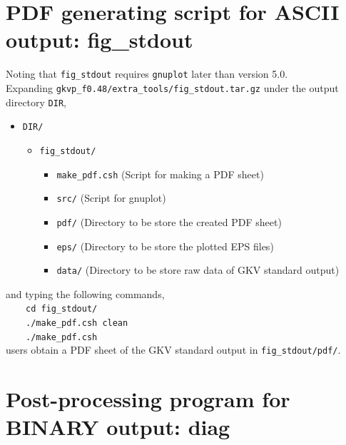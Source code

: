 \section{PDF generating script for ASCII output: fig\_stdout}
\label{sec:PDF generating script for ASCII output: fig_stdout}

Noting that \texttt{fig\_stdout} requires \texttt{gnuplot} later than version 5.0.\\ 
Expanding \texttt{gkvp\_f0.48/extra\_tools/fig\_stdout.tar.gz} under the output directory \texttt{DIR},
\begin{itemize}
  \item \texttt{DIR/}
  \begin{itemize}
    \item \texttt{fig\_stdout/}
    \begin{itemize}
      \item \texttt{make\_pdf.csh} (Script for making a PDF sheet)
      \item \texttt{src/} (Script for gnuplot)
      \item \texttt{pdf/} (Directory to be store the created PDF sheet)
      \item \texttt{eps/} (Directory to be store the plotted EPS files)
      \item \texttt{data/} (Directory to be store raw data of GKV standard output)
    \end{itemize}
  \end{itemize}
\end{itemize}
and typing the following commands,\\
~~~~\texttt{cd fig\_stdout/}\\
~~~~\texttt{./make\_pdf.csh  clean}\\
~~~~\texttt{./make\_pdf.csh}\\
users obtain a PDF sheet of the GKV standard output in \texttt{fig\_stdout/pdf/}.



\section{Post-processing program for BINARY output: diag}
\label{sec:Post-processing program for BINARY output: diag}

